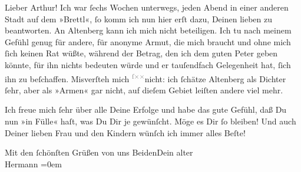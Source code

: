 \pstart\center{}Lieber Arthur!\pend\vspace{0.5em}
\pstart
           Ich war{ }ſechs Wochen unterwegs, jeden Abend in einer anderen Stadt auf dem »Brettl«,{ }ſo komm ich nun hier erſt dazu, Deinen lieben \label{K_L02107-112v}\label{K_L02107-112} zu beantworten. An Altenberg kann ich mich nicht beteiligen. Ich tu
               nach meinem Gefühl genug für andere, für anonyme Armut, die mich braucht und ohne
               mich{ }ſich keinen Rat wüßte, während der Betrag, den ich dem guten Peter geben könnte, für ihn nichts bedeuten würde und er
               tauſendfach Gelegenheit hat,{ }ſich ihn zu beſchaffen. Misverſteh mich \substVorne{}\textsuperscript{\textcolor{gray}{ſ}\textcolor{gray}{×}\-\textcolor{gray}{×}}\substDazwischen{}ni\substHinten{}cht: ich{ }ſchätze Altenberg als Dichter{ }ſehr, aber als »Armen« gar nicht, auf dieſem Gebiet leiſten andere viel mehr.\pend
           
\pstart
           Ich freue mich{ }ſehr über alle Deine Erfolge und habe das gute Gefühl, daß Du nun »in
               Fülle« haſt, was Du Dir je gewünſcht. Möge es Dir{ }ſo bleiben! Und auch Deiner lieben
                  Frau und den Kindern wünſch ich immer alles
               Beſte!\pend
           
\pstart
           Mit den{ }ſchönſten Grüßen von uns BeidenDein alter{\\[\baselineskip]}\spacefill\mbox{Hermann}\pend
           \leftskip=0em{}\endnumbering{}  \newcommand{\dateiname}{L02107}\newcommand{\titel}{Hermann Bahr an Arthur Schnitzler, 7. 12. 1912}\newcommand{\editorInnen}{Herausgegeben von Martin Anton Müller}
